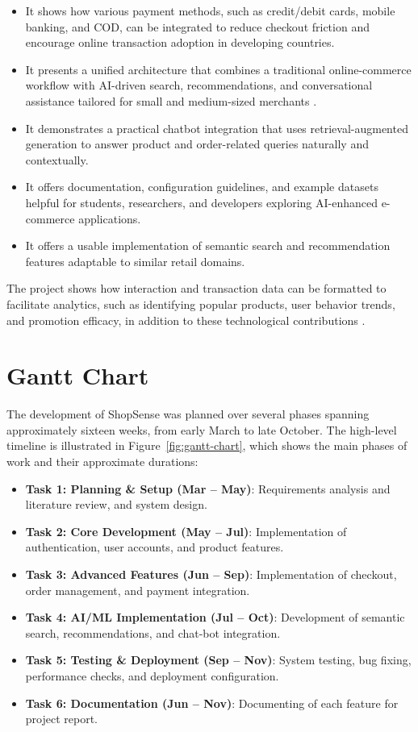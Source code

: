 \begin{itemize}
  \item It shows how various payment methods, such as credit/debit cards, mobile banking, and COD, can be integrated to reduce checkout friction and encourage online transaction adoption in developing countries.
  \item It presents a unified architecture that combines a traditional online-commerce workflow with AI-driven search, recommendations, and conversational assistance tailored for small and medium-sized merchants \cite{hasan2021mobile,rahman2018cod}.
  \item It demonstrates a practical chatbot integration that uses retrieval-augmented generation to answer product and order-related queries naturally and contextually.
  \item It offers documentation, configuration guidelines, and example datasets helpful for students, researchers, and developers exploring AI-enhanced e-commerce applications.
  \item It offers a usable implementation of semantic search and recommendation features adaptable to similar retail domains.
\end{itemize}

The project shows how interaction and transaction data can be formatted to facilitate analytics, such as identifying popular products, user behavior trends, and promotion efficacy, in addition to these technological contributions \cite{lee2020checkout}.

\section{Gantt Chart}
The development of ShopSense was planned over several phases spanning approximately sixteen weeks, from early March to late October. The high-level timeline is illustrated in Figure~\ref{fig:gantt-chart}, which shows the main phases of work and their approximate durations:

\begin{itemize}
  \item \textbf{Task 1: Planning \& Setup (Mar -- May)}: Requirements analysis and literature review, and system design.
  \item \textbf{Task 2: Core Development (May -- Jul)}: Implementation of authentication, user accounts, and product features.
  \item \textbf{Task 3: Advanced Features (Jun -- Sep)}: Implementation of checkout, order management, and payment integration.
  \item \textbf{Task 4: AI/ML Implementation (Jul -- Oct)}: Development of semantic search, recommendations, and chat-bot integration.
  \item \textbf{Task 5: Testing \& Deployment (Sep -- Nov)}: System testing, bug fixing, performance checks, and deployment configuration.
  \item \textbf{Task 6: Documentation (Jun -- Nov)}: Documenting of each feature for project report.
\end{itemize}

